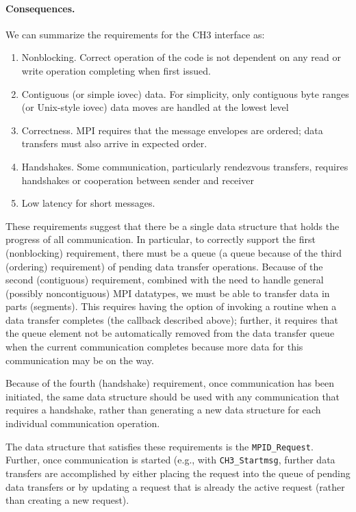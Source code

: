 \documentclass{article}
\def\code{\begingroup\makeustext\eatcode}
\def\eatcode#1{\texttt{#1}\endgroup}
\begin{document}
\paragraph{Consequences.}
We can summarize the requirements for the CH3 interface as:
\begin{enumerate}
\item Nonblocking.  Correct operation of the code is not dependent on any read
  or write operation completing when first issued.  
\item Contiguous (or simple iovec) data.  For simplicity, only contiguous byte
  ranges (or Unix-style iovec) data moves are handled at the lowest level
\item Correctness.  MPI requires that the message envelopes are ordered; data
  transfers must also arrive in expected order.
\item Handshakes.  Some communication, particularly rendezvous transfers,
  requires handshakes or cooperation between sender and receiver
\item Low latency for short messages.
\end{enumerate}
These requirements suggest that there be a single data structure that holds
the progress of all communication. 
In particular, to correctly support the first (nonblocking) requirement, there
must be a queue (a queue because of the third (ordering) requirement) of
pending data transfer operations.  
Because of the second (contiguous) requirement, combined with the need to
handle general (possibly noncontiguous) MPI datatypes, we must be able to
transfer data in parts (segments).  This requires having the option of
invoking a routine when a data transfer completes (the callback described
above); further, it requires that the queue element not be automatically
removed from the data transfer queue when the current communication completes
because more data for this communication may be on the way.

Because of the fourth (handshake) requirement, once communication has been
initiated, the same data structure should be used with any communication that
requires a handshake, rather than generating a new data structure for each
individual communication operation.  

The data structure that satisfies these requirements is the
\code{MPID_Request}.  Further, once communication is started (e.g., with
\code{CH3_Startmsg}, further data transfers are accomplished by either placing
the request into the queue of pending data transfers or by updating a request
that is already the active request (rather than creating a new request).
\end{document}
